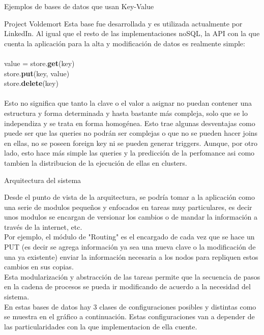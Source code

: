 \begin{section}{Ejemplos de bases de datos que usan Key-Value}
\begin{subsection}{Project Voldemort}
Esta base fue desarrollada y es utilizada actualmente por LinkedIn. Al igual que el resto de las implementaciones noSQL, la API con la que cuenta la aplicación para la alta y modificación de datos es realmente simple:\\
\\
value = store.\textbf{get}(key) \\
store.\textbf{put}(key, value) \\
store.\textbf{delete}(key) \\
\\
Esto no significa que tanto la clave o el valor a asignar no puedan contener una estructura y forma determinada y hasta bastante más compleja, solo que se lo independiza y se trata en forma homogénea. Esto trae algunas desventajas como puede ser que las queries no podrán ser complejas o que no se pueden hacer joins en ellas, no se poseen foreign key ni se pueden generar triggers. Aunque, por otro lado, esto hace más simple las queries y la predicción de la perfomance asi como tambien la distribucion de la ejecución de ellas en clusters. \\

\begin{subsubsection}{Arquitectura del sistema}

Desde el punto de vista de la arquitectura, se podría tomar a la aplicación como una serie de modulos pequeños y enfocados en tareas muy particulares, es decir unos modulos se encargan de versionar los cambios o de mandar la información a través de la internet, etc. \\

Por ejemplo, el módulo de "Routing" es el encargado de cada vez que se hace un PUT (es decir se agrega información ya sea una nueva clave o la modificación de una ya existente) enviar la información necesaria a los nodos para repliquen estos cambios en sus copias.\\

Esta modularización y abstracción de las tareas permite que la secuencia de pasos en la cadena de procesos se pueda ir modificando de acuerdo a la necesidad del sistema. \\

En estas bases de datos hay 3 clases de configuraciones posibles y distintas como se muestra en el gráfico a continuación. Estas configuraciones van a depender de las particularidades con la que implementacion de ella cuente.\\



\end{subsubsection}
\end{subsection}
\end{section}
